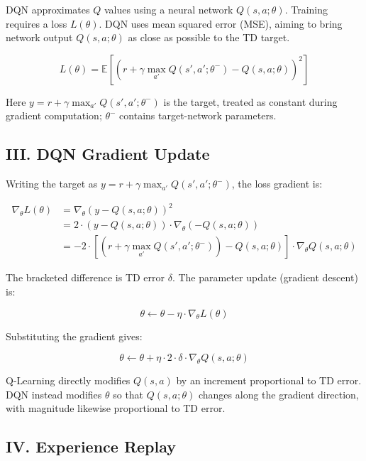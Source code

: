 DQN approximates \(Q\) values using a neural network \(Q(s,a;\theta)\). Training requires a loss \(L(\theta)\). DQN uses mean squared error (MSE), aiming to bring network output \(Q(s,a;\theta)\) as close as possible to the TD target.

\[
L(\theta)=\mathbb{E}\left[\left(r+\gamma\max_{a'}Q(s',a';\theta^-)-Q(s,a;\theta)\right)^2\right]
\]

Here \(y=r+\gamma\max_{a'}Q(s',a';\theta^-)\) is the target, treated as constant during gradient computation; \(\theta^-\) contains target-network parameters.

\hypertarget{iii.-dqn-gradient-update}{%
\subsection{III. DQN Gradient Update}\label{iii.-dqn-gradient-update}}

Writing the target as \(y=r+\gamma\max_{a'}Q(s',a';\theta^-)\), the loss gradient is:

\[
\begin{aligned}
\nabla_\theta L(\theta)
&=\nabla_\theta\left(y-Q(s,a;\theta)\right)^2\\
&=2\cdot\left(y-Q(s,a;\theta)\right)\cdot\nabla_\theta\left(-Q(s,a;\theta)\right)\\
&=-2\cdot\left[\left(r+\gamma\max_{a'}Q(s',a';\theta^-)\right)-Q(s,a;\theta)\right]\cdot\nabla_\theta Q(s,a;\theta)
\end{aligned}
\]

The bracketed difference is TD error \(\delta\). The parameter update (gradient descent) is:

\[
\theta\leftarrow\theta-\eta\cdot\nabla_\theta L(\theta)
\]

Substituting the gradient gives:

\[
\theta\leftarrow\theta+\eta\cdot2\cdot\delta\cdot\nabla_\theta Q(s,a;\theta)
\]

Q-Learning directly modifies \(Q(s,a)\) by an increment proportional to TD error. DQN instead modifies \(\theta\) so that \(Q(s,a;\theta)\) changes along the gradient direction, with magnitude likewise proportional to TD error.

\hypertarget{iv.-experience-replay}{%
\subsection{IV. Experience Replay}\label{iv.-experience-replay}}

